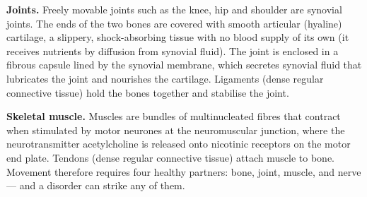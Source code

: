\documentclass[11pt]{article}
\newcommand{\cle}[1]{{\popxbold\color{popdark}#1}}
\begin{document}
\textbf{Joints.} Freely movable joints such as the knee, hip and shoulder are \cle{synovial joints}. The ends of the two bones are covered with smooth \cle{articular (hyaline) cartilage}, a slippery, shock-absorbing tissue with no blood supply of its own (it receives nutrients by diffusion from synovial fluid). The joint is enclosed in a fibrous capsule lined by the \cle{synovial membrane}, which secretes \cle{synovial fluid} that lubricates the joint and nourishes the cartilage. Ligaments (dense regular connective tissue) hold the bones together and stabilise the joint.

\textbf{Skeletal muscle.} Muscles are bundles of multinucleated fibres that contract when stimulated by motor neurones at the \cle{neuromuscular junction}, where the neurotransmitter \cle{acetylcholine} is released onto nicotinic receptors on the motor end plate. Tendons (dense regular connective tissue) attach muscle to bone. Movement therefore requires four healthy partners: bone, joint, muscle, and nerve — and a disorder can strike any of them.
\end{document}
